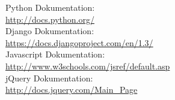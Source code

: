 Python Dokumentation:\\ \url{http://docs.python.org/}\\
Django Dokumentation:\\ \url{https://docs.djangoproject.com/en/1.3/}\\
Javascript Dokumentation:\\ \url{http://www.w3schools.com/jsref/default.asp}\\
jQuery Dokumentation:\\ \url{http://docs.jquery.com/Main_Page}\\
